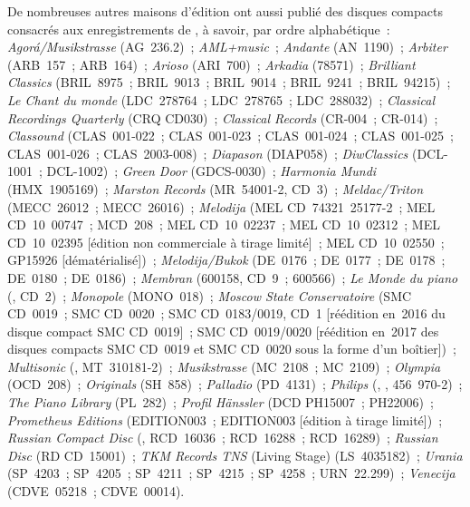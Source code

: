De nombreuses autres maisons d'édition ont aussi publié des disques compacts
consacrés aux enregistrements de \VSofronitsky{}, à savoir, par ordre
alphabétique~:
\emph{Agorá/Musikstrasse} (AG~236.2)~;
\emph{AML+music}~;
\emph{Andante} (AN~1190)~;
\emph{Arbiter} (ARB~157~; ARB~164)~;
\emph{Arioso} (ARI~700)~;
\emph{Arkadia} (78571)~;
\emph{Brilliant Classics} (BRIL~8975~; BRIL~9013~; BRIL~9014~; BRIL~9241~;
BRIL~94215)~;
\emph{Le Chant du monde} (LDC~278764~; LDC~278765~; LDC~288032)~;
\emph{Classical Recordings Quarterly} (CRQ CD030)~;
\emph{Classical Records} (CR-004~; CR-014)~;
\emph{Classound} (CLAS~001-022~; CLAS~001-023~; CLAS~001-024~;
CLAS~001-025~; CLAS~001-026~; CLAS~2003-008)~;
\emph{Diapason} (DIAP058)~;
\emph{DiwClassics} (DCL-1001~; DCL-1002)~;
\emph{Green Door} (GDCS-0030)~;
\emph{Harmonia Mundi} (HMX~1905169)~;
\emph{Marston Records} (MR~\hbox{54001-2}, CD~3)~;
\emph{Meldac/Triton} (MECC~26012~; MECC~26016)~;
\emph{Melodija} (MEL CD~74321~25177-2~; MEL CD~10~00747~; MCD~208~;
MEL CD~10~02237~; MEL CD~10~02312~; MEL CD~10~02395 [édition non commerciale
à tirage limité]~; MEL CD~10~02550~; GP15926 [dématérialisé])~;
\emph{Melodija/Bukok} (DE~0176~; DE~0177~; DE~0178~; DE~0180~; DE~0186)~;
\emph{Membran} (600158, CD~9~; 600566)~;
\emph{Le Monde du piano} (, CD~2)~;
\emph{Monopole} (MONO~018)~;
\emph{Moscow State Conservatoire} (SMC CD~0019~; SMC CD~0020~; SMC
CD~0183/0019, CD~1 [réédition en~2016 du disque compact SMC CD~0019]~; SMC
CD~0019/0020 [réédition en~2017 des disques compacts SMC CD~0019 et SMC
CD~0020 sous la forme d'un boîtier])~;
\emph{Multisonic} (, MT~310181-2)~;
\emph{Musikstrasse} (MC~2108~; MC~2109)~;
\emph{Olympia} (OCD~208)~;
\emph{Originals} (SH~858)~;
\emph{Palladio} (PD~4131)~;
\emph{Philips} (, ,
456~970-2)~;
\emph{The Piano Library} (PL~282)~;
\emph{Profil Hänssler} (DCD PH15007~; PH22006)~;
\emph{Prometheus Editions} (EDITION003~; EDITION003\OneHalf{} [édition à
tirage limité])~;
\emph{Russian Compact Disc} (, RCD~16036~; RCD~16288~; RCD~16289)~;
\emph{Russian Disc} (RD CD~15001)~;
\emph{TKM Records TNS} (Living Stage) (LS~4035182)~;
\emph{Urania} (SP~4203~; SP~4205~; SP~4211~; SP~4215~; SP~4258~;
URN~22.299)~;
\emph{Venecija} (CDVE~05218~; CDVE~00014).

